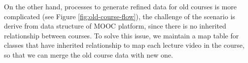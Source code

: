 On the other hand, processes to generate refined data for old courses is more complicated (see Figure \ref{fig:old-course-flow}), the challenge of the scenario is derive from data structure of MOOC platform, since there is no inherited relationship between courses.
To solve this issue, we maintain a map table for classes that have inherited relationship to map each lecture video in the course, so that we can merge the old course data with new one.
